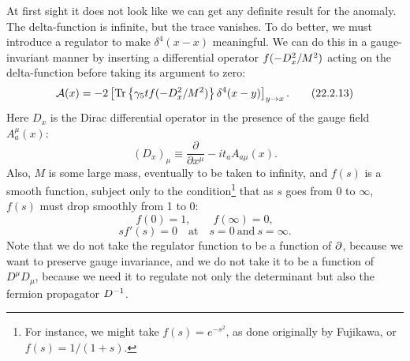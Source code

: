 At first sight it does not look like we can get any definite result for the
anomaly. The delta-function is infinite, but the trace vanishes. To do
better, we must introduce a regulator to make $\delta^4(x-x)$ meaningful.
We can do this in a gauge-invariant manner by inserting a differential
operator $f(-\sl{D}_x^2/M^2)$ acting on the delta-function before taking
its argument to zero:
\begin{equation}
 \mathcal A(x)=-2\left[
  \operatorname{Tr}\left\{\gamma_5t
  f(-\sl{D}_x^2/M^2)\right\}\delta^4(x-y)
 \right]_{y\to x}.
 \tag{22.2.13}\label{eq:22.2.13}
\end{equation}
Here $D_x$ is the Dirac differential operator in the presence of the gauge
field $A_a^\mu(x)$:
\begin{equation}
 (D_x)_\mu\equiv\frac{\partial}{\partial x^\mu}
 -it_a A_{a\mu}(x).
 \tag{22.2.14}\label{eq:22.2.14}
\end{equation}
Also, $M$ is some large mass, eventually to be taken to infinity, and
$f(s)$ is a smooth function, subject only to the condition\footnote{For
instance, we might take $f(s)=e^{-s^2}$, as done originally by Fujikawa,
or $f(s)=1/(1+s)$.} that as $s$ goes from 0 to $\infty$, $f(s)$ must drop
smoothly from 1 to 0:
\begin{equation}
 f(0)=1,\qquad f(\infty)=0,
 \tag{22.2.15}\label{eq:22.2.15}
\end{equation}
\begin{equation}
 sf'(s)=0\quad\text{at}\quad s=0\ \text{and}\ s=\infty.
 \tag{22.2.16}\label{eq:22.2.16}
\end{equation}
Note that we do not take the regulator function to be a function of
$\sl{\partial}$, because we want to preserve gauge invariance, and we do
not take it to be a function of $D^\mu D_\mu$, because we need it to
regulate not only the determinant but also the fermion propagator
$\sl{D}^{-1}$.

